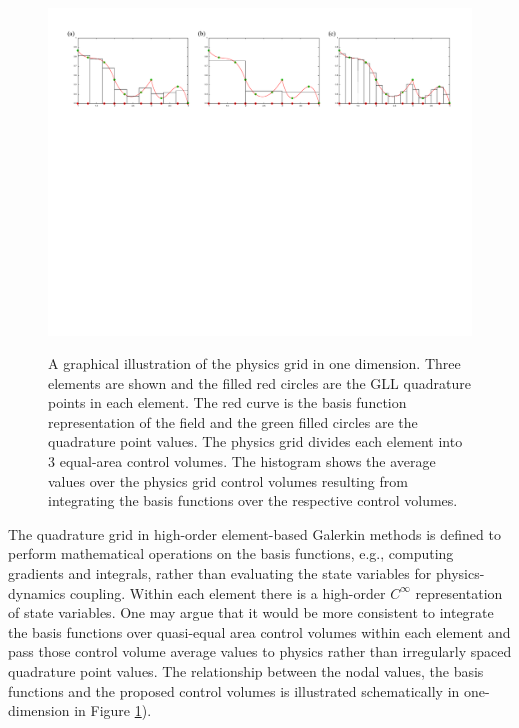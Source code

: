 \documentclass[twocol]{ametsoc}
\begin{document}
\begin{figure}[t]
\noindent\includegraphics[width=38pc,angle=0]{figs/physgrid-1d_3x3.pdf}\\
\caption{A graphical illustration of the physics grid in one dimension. Three elements are shown and the filled red circles are the GLL quadrature points in each element. The red curve is the basis function representation of the field and the green filled circles are the quadrature point values. The physics grid divides each element into 3 equal-area control volumes. The histogram shows the average values over the physics grid control volumes resulting from integrating the basis functions over the respective control volumes.}
\label{fig:physgrid-1d}
\end{figure}

The quadrature grid in high-order element-based Galerkin methods is defined to perform mathematical operations on the basis functions, e.g., computing gradients and integrals, rather than evaluating the state variables for physics-dynamics coupling. Within each element there is a high-order $C^{\infty}$ representation of state variables. One may argue that it would be more consistent to integrate the basis functions over quasi-equal area control volumes within each element and pass those control volume average values to physics rather than irregularly spaced quadrature point values. The relationship between the nodal values, the basis functions and the proposed control volumes is illustrated schematically in one-dimension in Figure \ref{fig:physgrid-1d}).
\end{document}
